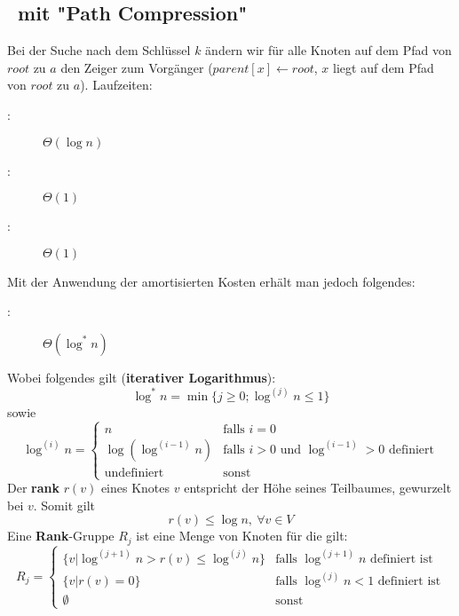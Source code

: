 \subsection{\find~mit "Path Compression"}
Bei der Suche nach dem Schlüssel $k$ ändern wir für alle Knoten auf dem Pfad von $root$ zu $a$ den Zeiger zum Vorgänger ($parent[x] \leftarrow root$, $x$ liegt auf dem Pfad von $root$ zu $a$).
Laufzeiten:
\begin{description}
	\item[\find:] $\Theta(\log n)$
	\item[\union:] $\Theta(1)$
	\item[\makeset:] $\Theta(1)$
\end{description}
Mit der Anwendung der amortisierten Kosten erhält man jedoch folgendes:
\begin{description}
	\item[\find:] $\Theta(\log^{*} n)$
\end{description}
Wobei folgendes gilt (\textbf{iterativer Logarithmus}):
\[\log^{*} n = \min \{j \geq 0;\log^{(j)} n \leq 1\}\]
sowie
\[\log^{(i)} n = \left\{ \begin{array}{ll}
		n & \text{falls } i=0\\
		\log(\log^{(i-1)}n) & \text{falls } i>0 \text{ und } \log^{(i-1)} >0 \text{ definiert}\\
		\text{undefiniert}&\text{sonst}
	\end{array}\right. \]
Der \textbf{rank} $r(v)$ eines Knotes $v$ entspricht der Höhe seines Teilbaumes, gewurzelt bei $v$. Somit gilt
\[r(v) \leq \log n,~\forall v \in V\]
Eine \textbf{Rank}-Gruppe $R_j$ ist eine Menge von Knoten für die gilt:
\[R_j=\left\{ 
	\begin{array}{ll}
		\{v | \log^{(j+1)} n > r(v) \leq \log^{(j)}n\} & \text{falls } \log^{(j+1)} n \text{ definiert ist}\\
		\{v | r(v) = 0\} & \text{falls } \log^{(j)} n < 1 \text{ definiert ist}\\
		\emptyset & \text{sonst}
	\end{array}
\right.\]
\topbreak
\up
{}
